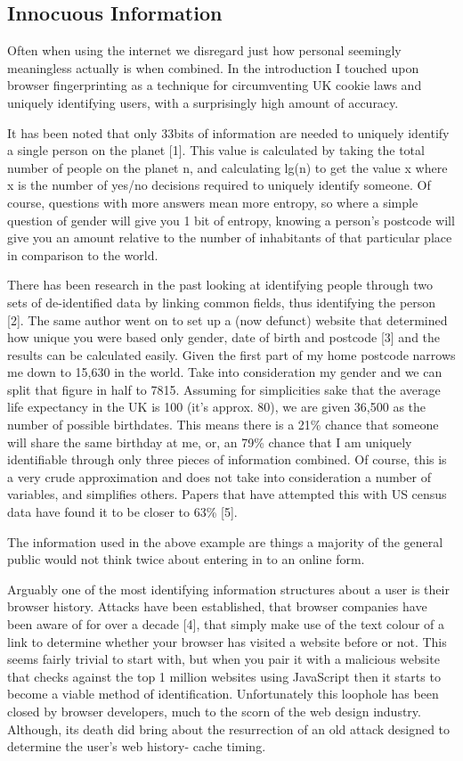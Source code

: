 \subsection{Innocuous Information}
Often when using the internet we disregard just how personal seemingly meaningless actually is when combined. In the introduction I touched upon browser fingerprinting as a technique for circumventing UK cookie laws and uniquely identifying users, with a surprisingly high amount of accuracy. 

It has been noted that only 33bits of information are needed to uniquely identify a single person on the planet [1]. This value is calculated by taking the total number of people on the planet n, and calculating lg(n) to get the value x where x is the number of yes/no decisions required to uniquely identify someone. Of course, questions with more answers mean more entropy, so where a simple question of gender will give you 1 bit of entropy, knowing a person’s postcode will  give you an amount relative to the number of inhabitants of that particular place in comparison to the world.

There has been research in the past looking at identifying people through two sets of de-identified data by linking common fields, thus identifying the person [2]. The same author went on to set up a (now defunct) website that determined how unique you were based only gender, date of birth and postcode [3] and the results can be calculated easily. Given the first part of my home postcode narrows me down to 15,630 in the world. Take into consideration my gender and we can split that figure in half to 7815. Assuming for simplicities sake that the average life expectancy in the UK is 100 (it’s approx. 80), we are given 36,500 as the number of possible birthdates. This means there is a 21\% chance that someone will share the same birthday at me, or, an 79\% chance that I am uniquely identifiable through only three pieces of information combined. Of course, this is a very crude approximation and does not take into consideration a number of variables, and simplifies others. Papers that have attempted this with US census data have found it to be closer to 63\% [5].

The information used in the above example are things a majority of the general public would not think twice about entering in to an online form.

Arguably one of the most identifying information structures about a user is their browser history. Attacks have been established, that browser companies have been aware of for over a decade [4], that simply make use of the text colour of a link to determine whether your browser has visited a website before or not. This seems fairly trivial to start with, but when you pair it with a malicious website that checks against the top 1 million websites using JavaScript then it starts to become a viable method of identification. Unfortunately this loophole has been closed by browser developers, much to the scorn of the web design industry. Although, its death did bring about the resurrection of an old attack designed to determine the user's web history- cache timing. 
